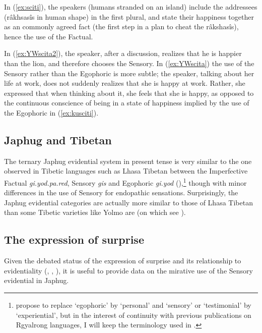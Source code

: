 \documentclass[oldfontcommands,oneside,a4paper,11pt]{article}
\newcommand{\ipa}[1]{{\phon\textit{#1}}} %
\newcommand{\refb}[1]{(\ref{#1})}
\begin{document}
In \refb{ex:sciti}, the speakers (humans stranded on an island) include the addressees (râkhsasîs in human shape) in the first plural, and state their happiness together as an commonly agreed fact (the first step in a plan to cheat the râkshasîs), hence the use of the Factual. 

In \refb{ex:YWscita2}, the speaker, after a discussion, realizes that he is happier than the lion, and therefore chooses the Sensory. In \refb{ex:YWscita} the use of the Sensory rather than the Egophoric is more subtle; the speaker, talking about her life at work, does not suddenly realizes that she is happy at work. Rather, she expressed that when thinking about it, she feels that she is happy, as opposed to the continuous conscience of being in a state of happiness implied by the use of the Egophoric in \refb{ex:kusciti}.


\subsection{Japhug and Tibetan}
The ternary Japhug evidential system in present tense is very similar to the one observed in Tibetic languages such as Lhasa Tibetan between the Imperfective Factual \ipa{gi.yod.pa.red}, Sensory \textit{gis} and Egophoric \ipa{gi.yod} (\citealt[295+]{tournadre08conjunct}),\footnote{\citet{hill17evidential} propose to replace `egophoric' by ‘personal’ and `sensory' or `testimonial' by ‘experiential’, but in the interest of continuity with previous publications on Rgyalrong languages, I will keep the terminology used in \citet{jacques17sketch}. } though with minor differences in the use of Sensory for endopathic sensations. Surprisingly, the Japhug evidential categories are actually more similar to those of Lhasa Tibetan than some Tibetic varieties like Yolmo are (on which see \citealt{gawne13copulas}). 
 
\subsection{The expression of surprise}
Given the debated status of the expression of surprise and its relationship to evidentiality (\citealt{hill12mirativity}, \citealt{delancey12still}, \citealt{aikhenvald12mirativity}), it is useful to provide data on the mirative use of the Sensory evidential in Japhug. 
\end{document}
